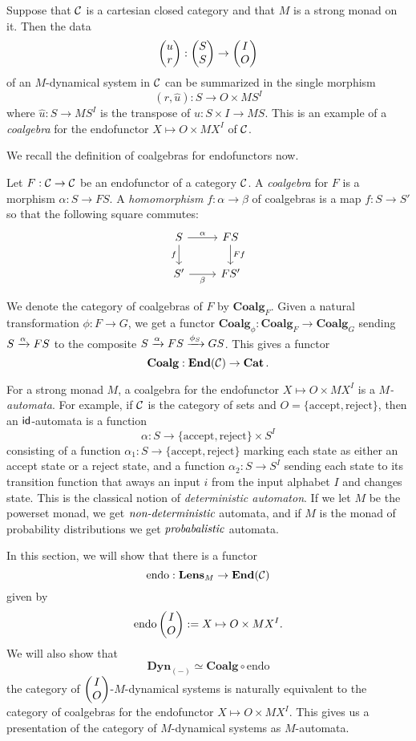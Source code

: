 Suppose that $\operatorname{\mathcal{C}}$ is a cartesian closed category and that $M$ is a strong monad
on it. Then the data
$$\begin{pmatrix}{u} \\ {r} \end{pmatrix} : \begin{pmatrix}{S} \\ {S} \end{pmatrix} \to \begin{pmatrix}{I} \\ {O} \end{pmatrix}$$
of an $M$-dynamical system in $\operatorname{\mathcal{C}}$ can be summarized in the single morphism
$$(r, \hat{u}) : S \to O \times MS^I$$
where $\hat{u} : S \to MS^I$ is the transpose of $u : S \times I \to MS$. This
is an example of a \emph{coalgebra} for the endofunctor $X \mapsto O \times
MX^I$ of $\operatorname{\mathcal{C}}$.

We recall the definition of coalgebras for endofunctors now.
\begin{defn}
Let $F : \operatorname{\mathcal{C}} \to \operatorname{\mathcal{C}}$ be an endofunctor of a category $\operatorname{\mathcal{C}}$. A \emph{coalgebra}
for $F$ is a morphism $\alpha : S \to FS$. A \emph{homomorphism} $f : \alpha \to
\beta$ of coalgebras is a map $f : S \to S'$ so that the following square
commutes:
\[
\begin{tikzcd}
S \arrow[d,"f"'] \arrow[r,"\alpha" ] & FS \arrow[d,"Ff" ] \\
S' \arrow[r,"\beta"'] & FS'
\end{tikzcd}
\]

We denote the category of coalgebras of $F$ by $\textbf{Coalg}_F$. Given a
natural transformation $\phi : F \to G$, we get a functor $\textbf{Coalg}_\phi :
\textbf{Coalg}_{F} \to \textbf{Coalg}_G$ sending $S \xrightarrow{\alpha} FS$ to the
composite $S \xrightarrow{\alpha} FS \xrightarrow{\phi_S} GS$. This gives a functor
$$\textbf{Coalg} : \textbf{End}(\operatorname{\mathcal{C}}) \to \operatorname{\textbf{Cat}}.$$
\end{defn}

For a strong monad $M$, a coalgebra for the endofunctor $X \mapsto O \times
MX^I$ is a \emph{$M$-automata}. For example, if $\operatorname{\mathcal{C}}$ is the category of sets
and $O = \{\text{accept}, \text{reject}\}$, then an $\operatorname{\mathsf{id}}$-automata is a function
$$\alpha : S \to \{\text{accept}, \text{reject}\} \times S^I$$
consisting of a function $\alpha_1 : S \to \{\text{accept}, \text{reject}\}$
marking each state as either an accept state or a reject state, and a function
$\alpha_2 : S \to S^I$ sending each state to its transition function that aways
an input $i$ from the input alphabet $I$ and changes state. This is the
classical notion of \emph{deterministic automaton}. If we let $M$ be the
powerset monad, we get $\emph{non-deterministic}$ automata, and if $M$ is the
monad of probability distributions we get $\emph{probabalistic}$ automata.


In this section, we will show that there is a functor
$$\text{endo} : \textbf{Lens}_{M} \to \textbf{End}(\operatorname{\mathcal{C}})$$
given by 
$$\text{endo}\begin{pmatrix}{I} \\ {O} \end{pmatrix} := X \mapsto O \times MX^I.$$
We will also show that 
$$\textbf{Dyn}_{(-)} \simeq \textbf{Coalg} \circ \text{endo}$$
the category of $\begin{pmatrix}{I} \\ {O} \end{pmatrix}$-$M$-dynamical systems is naturally equivalent to the
category of coalgebras for the endofunctor $X \mapsto O \times MX^I$. This gives
us a presentation of the category of $M$-dynamical systems as $M$-automata.


